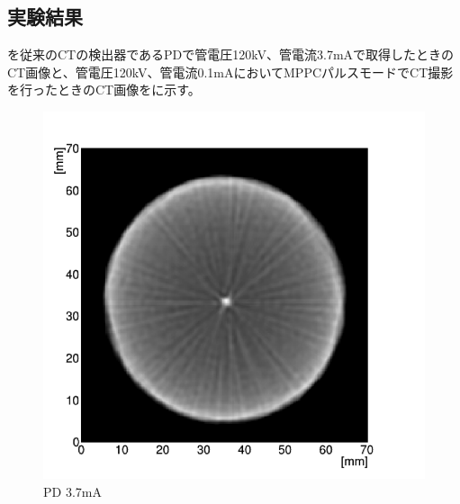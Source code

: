 \subsection{実験結果}

を従来のCTの検出器であるPDで管電圧120kV、管電流3.7mAで取得したときのCT画像と、管電圧120kV、管電流0.1mAにおいてMPPCパルスモードでCT撮影を行ったときのCT画像をに示す。

\begin{figure}[H]
 \begin{minipage}{0.5\hsize}
  \begin{center}
 \includegraphics[bb=0.000000 0.000000 347.491274 334.532345,width=1\hsize]{image2/chapter5/CT_MTF_PD.png} 
  \end{center}
  \vspace{-1cm}
  \caption*{PD 3.7mA}
 \end{minipage}
 \begin{minipage}{0.5\hsize}
  \begin{center}

\end{center}
\end{minipage}
\end{figure}
